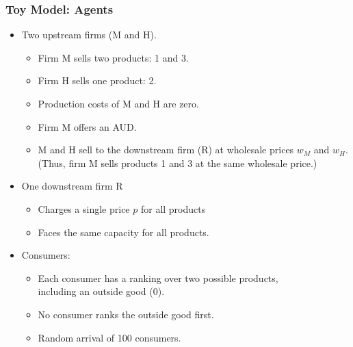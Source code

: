 \begin{frame}
  \frametitle{Toy Model: Agents}
\begin{itemize}\footnotesize
\item Two upstream firms (M and H).  
	\begin{itemize}\scriptsize
	\item Firm M sells two products: 1 and 3.
	\item Firm H sells one product: 2.
	\item Production costs of M and H are zero.
	\item Firm M offers an AUD.
	\item M and H sell to the downstream firm (R) at wholesale prices $w_M$ and $w_H$. (Thus, firm M sells products 1 and 3 at the same wholesale price.)
	\end{itemize}
\item One downstream firm R
	\begin{itemize}\scriptsize
	\item Charges a single price $p$ for all products
	\item Faces the same capacity for all products.
	\end{itemize}
\item Consumers:
	\begin{itemize}\scriptsize
	\item Each consumer has a ranking over two possible products, \\ including an outside good (0).
	\item No consumer ranks the outside good first.
	\item Random arrival of 100 consumers.
	\end{itemize}
\end{itemize}
\end{frame}


